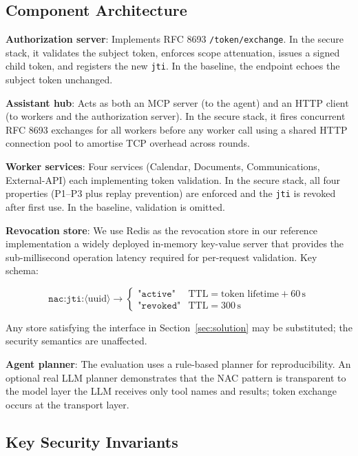 \documentclass[journal]{IEEEtran}
\begin{document}
\subsection{Component Architecture}

\textbf{Authorization server}: Implements RFC 8693 \texttt{/token/exchange}.
In the secure stack, it validates the subject token, enforces scope attenuation,
issues a signed child token, and registers the new \texttt{jti}. In the baseline,
the endpoint echoes the subject token unchanged.

\textbf{Assistant hub}: Acts as both an MCP server (to the agent) and an HTTP
client (to workers and the authorization server). In the secure stack, it fires
concurrent RFC 8693 exchanges for all workers before any worker call using a
shared HTTP connection pool to amortise TCP overhead across rounds.

\textbf{Worker services}: Four services (Calendar, Documents, Communications,
External-API) each implementing token validation. In the secure stack, all four
properties (P1--P3 plus replay prevention) are enforced and the \texttt{jti} is
revoked after first use. In the baseline, validation is omitted.

\textbf{Revocation store}: We use Redis \cite{redis} as the revocation store
in our reference implementation a widely deployed in-memory key-value server
that provides the sub-millisecond operation latency required for per-request
validation. Key schema:

\begin{equation}
\texttt{nac:jti:}\langle\text{uuid}\rangle \to
\begin{cases}
  \texttt{"active"}  & \text{TTL} = \text{token lifetime} + 60\,\text{s} \\
  \texttt{"revoked"} & \text{TTL} = 300\,\text{s}
\end{cases}
\end{equation}

Any store satisfying the interface in Section~\ref{sec:solution} may be
substituted; the security semantics are unaffected.

\textbf{Agent planner}: The evaluation uses a rule-based planner for
reproducibility. An optional real LLM planner demonstrates that the NAC pattern
is transparent to the model layer the LLM receives only tool names and results;
token exchange occurs at the transport layer.

\subsection{Key Security Invariants}
\end{document}
